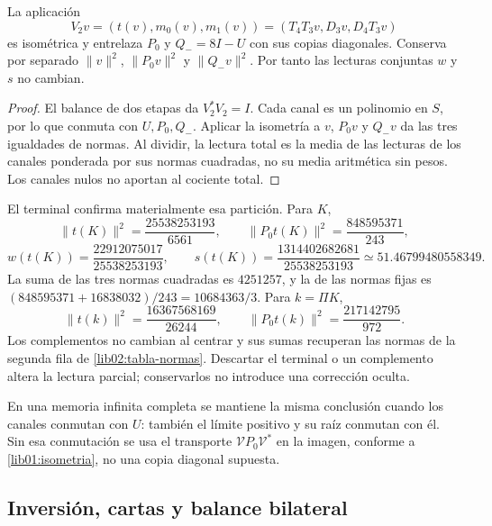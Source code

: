 \begin{proposition}
\label{lib02:memoria-ternaria}
La aplicación
\[
 V_2v=(t(v),m_0(v),m_1(v))
 =(T_4T_3v,D_3v,D_4T_3v)
\]
es isométrica y entrelaza \(P_0\) y \(Q_-=8I-U\) con sus
copias diagonales. Conserva por separado \(\|v\|^2\),
\(\|P_0v\|^2\) y \(\|Q_-v\|^2\). Por tanto las lecturas
conjuntas \(w\) y \(s\) no cambian.
\end{proposition}
\begin{proof}
El balance de dos etapas da \(V_2^*V_2=I\). Cada canal es un
polinomio en \(S\), por lo que conmuta con \(U,P_0,Q_-\).
Aplicar la isometría a \(v\), \(P_0v\) y \(Q_-v\) da las tres
igualdades de normas. Al dividir, la lectura total es la media de las
lecturas de los canales ponderada por sus normas cuadradas, no su media
aritmética sin pesos. Los canales nulos no aportan al cociente total.
\end{proof}

El terminal confirma materialmente esa partición. Para \(K\),
\[
 \|t(K)\|^2=\frac{25538253193}{6561},\qquad
 \|P_0t(K)\|^2=\frac{848595371}{243},
\]
\[
 w(t(K))=\frac{22912075017}{25538253193},\qquad
 s(t(K))=\frac{1314402682681}{25538253193}
 \simeq51.46799480558349.
\]
La suma de las tres normas cuadradas es \(4251257\), y la de las
normas fijas es
\((848595371+16838032)/243=10684363/3\). Para \(k=\Pi K\),
\[
 \|t(k)\|^2=\frac{16367568169}{26244},\qquad
 \|P_0t(k)\|^2=\frac{217142795}{972}.
\]
Los complementos no cambian al centrar y sus sumas recuperan las normas
de la segunda fila de \eqref{lib02:tabla-normas}. Descartar el terminal
o un complemento altera la lectura parcial; conservarlos no introduce
una corrección oculta.

En una memoria infinita completa se mantiene la misma conclusión cuando
los canales conmutan con \(U\): también el límite positivo y su raíz
conmutan con él. Sin esa conmutación se usa el transporte
\(\mathcal VP_0\mathcal V^*\) en la imagen, conforme a
\cref{lib01:isometria}, no una copia diagonal supuesta.

\subsection{Inversión, cartas y balance bilateral}
\label{lib02:bidireccional}

